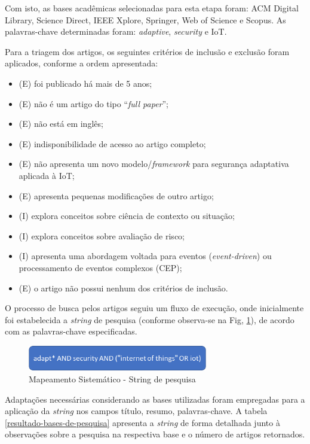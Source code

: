 \documentclass[tid,table]{texufpel} %
\begin{document}
Com isto, as bases acadêmicas selecionadas para esta etapa foram: ACM Digital Library, Science Direct, IEEE Xplore, Springer, Web of Science e Scopus. As palavras-chave determinadas foram: \textit{adaptive}, \textit{security} e IoT. 

Para a triagem dos artigos, os seguintes critérios de inclusão e exclusão foram aplicados, conforme a ordem apresentada:

\begin{itemize}

\item (E) foi publicado há mais de 5 anos;
\item (E) não é um artigo do tipo ``\textit{full paper}'';
\item (E) não está em inglês;
\item (E) indisponibilidade de acesso ao artigo completo;
\item (E) não apresenta um novo modelo/\textit{framework} para segurança adaptativa aplicada à IoT;
\item (E) apresenta pequenas modificações de outro artigo;
\item (I) explora conceitos sobre ciência de contexto ou situação;
\item (I) explora conceitos sobre avaliação de risco;
\item (I) apresenta uma abordagem voltada para eventos (\textit{event-driven}) ou processamento de eventos complexos (CEP);
\item (E) o artigo não possui nenhum dos critérios de inclusão.

\end{itemize}

O processo de busca pelos artigos seguiu um fluxo de execução, onde inicialmente foi estabelecida a \textit{string} de pesquisa (conforme observa-se na Fig, \ref{string-de-pesquisa}), de acordo com as palavras-chave especificadas.

\begin{figure}[ht]
\centering
\includegraphics[width=0.7\textwidth]{imagens/string-de-pesquisa.png}
\caption{Mapeamento Sistemático - String de pesquisa}
\label{string-de-pesquisa}
\end{figure}

Adaptações necessárias considerando as bases utilizadas foram empregadas para a aplicação da \textit{string} nos campos título, resumo, palavras-chave. A tabela \ref{resultado-bases-de-pesquisa} apresenta a \textit{string} de forma detalhada junto à observações sobre a pesquisa na respectiva base e o número de artigos retornados.
\end{document}
